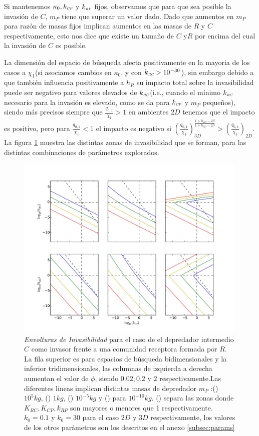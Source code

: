 Si mantenemos $\kappa_0,k_{\textit{\tiny CP}}$ y $k_{\textit{\tiny RP}}$ fijos, observamos que para que sea posible la invasi\'on de $C$, $m_P$ tiene que superar un valor dado. Dado que aumentos en $m_P$ para raz\'on de masas fijos implican aumentos en las masas de $R$ y $C$ respectivamente, esto nos dice que existe un tama\~no de $C$ y$R$ por encima del cual la invasi\'on de $C$ es posible.

La dimensi\'on del espacio de b\'usqueda afecta positivamente en la mayoria de los casos a $\chi_1$(si asociamos cambios en $\kappa_0$, y con $k_{\textit{\tiny RC}} > 10^{-30}$), sin embargo debido a que tambi\'en influencia positivamente a $h_R$ su impacto total sobre la invasibilidad puede ser negativo para valores elevados de $k_{\textit{\tiny RC}}$(i.e., cuando el m\'inimo $k_{\textit{\tiny RC}}$ necesario para la invasi\'on es elevado, como se da para $k_{\textit{\tiny CP}}$ y $m_P$ peque\~nos), siendo m\'as precisos siempre que $\frac{q_{0,1}}{\chi_1} >1$ en ambientes $2D$ tenemos que el impacto es positivo, pero para $\frac{q_{0,1}}{\chi_1} < 1$ el impacto es negativo si $ (\frac{q_{0,1}}{\chi_1})_{3D}^\frac{1 + h_{2D} - 2 \beta}{1 + h_{3D} - 2 \beta} >  (\frac{q_{0,1}}{\chi_1})_{2D} $.\\ La figura \ref{fig:Z(IC2)} muestra las distintas zonas de invasibilidad que se forman, para las distintas combinaciones de par\'ametros explorados.


\begin{figure}
  \centering
  \includegraphics[width = 0.99\textwidth]{./Plots/Z(IC2)AcGrGr.pdf}
  \caption[Env $Z(IC2)$]{\emph{Envolturas de Invasibilidad} para el caso de el depredador intermedio $C$ como invasor frente a una comunidad receptora formada por $R$. La fila superior es para espacios de b\'usqueda bidimensionales y la inferior tridimensionales, las columnas de izquierda a derecha aumentan el valor de $\phi$, siendo $0.02,0.2$ y $2$ respectivamente.Las diferentes lineas implican distintas masas de depredador $m_P$ :({\hwplotR}) $10^5 kg$,  ({\hwplotY}) $1kg$, ({\hwplotG}) $10^{-5}kg$ y ({\hwplotB}) para $10^{-10}kg$. ({\hwplotK}) separa las zonas donde $K_{RC},K_{CP},k_{RP}$ son mayores o menores que 1 respectivamente. $k_0 = 0.1$ y $k_0 = 30$ para el caso $2D$ y $3D$ respectivamente, los valores de los otros par\'ametros son los descritos en el anexo \ref{subsec:params}}
  \label{fig:Z(IC2)}
\end{figure}
